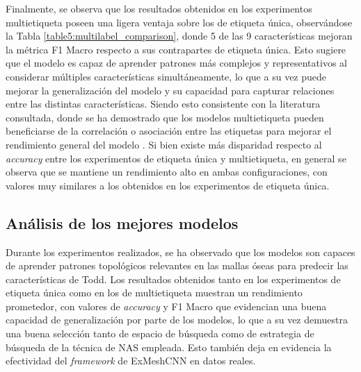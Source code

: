 Finalmente, se observa que los resultados obtenidos en los experimentos multietiqueta poseen una ligera ventaja sobre los de etiqueta única, observándose la Tabla \ref{table5:multilabel_comparison}, donde 5 de las 9 características mejoran la métrica F1 Macro respecto a sus contrapartes de etiqueta única. Esto sugiere que el modelo es capaz de aprender patrones más complejos y representativos al considerar múltiples características simultáneamente, lo que a su vez puede mejorar la generalización del modelo y su capacidad para capturar relaciones entre las distintas características. Siendo esto consistente con la literatura consultada, donde se ha demostrado que los modelos multietiqueta pueden beneficiarse de la correlación o asociación entre las etiquetas para mejorar el rendimiento general del modelo \cite{ranjan_hyperface_2019}. Si bien existe más disparidad respecto al \textit{accuracy} entre los experimentos de etiqueta única y multietiqueta, en general se observa que se mantiene un rendimiento alto en ambas configuraciones, con valores muy similares a los obtenidos en los experimentos de etiqueta única.

\subsection{Análisis de los mejores modelos}
\label{best_models_analysis}
Durante los experimentos realizados, se ha observado que los modelos son capaces de aprender patrones topológicos relevantes en las mallas óseas para predecir las características de Todd. Los resultados obtenidos tanto en los experimentos de etiqueta única como en los de multietiqueta muestran un rendimiento prometedor, con valores de \textit{accuracy} y F1 Macro que evidencian una buena capacidad de generalización por parte de los modelos, lo que a su vez demuestra una buena selección tanto de espacio de búsqueda como de estrategia de búsqueda de la técnica de NAS empleada. Esto también deja en evidencia la efectividad del \textit{framework} de ExMeshCNN en datos reales.

